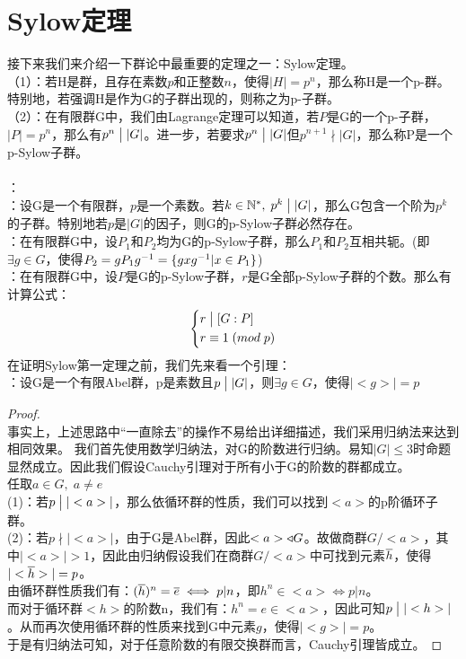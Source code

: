 \section{Sylow定理}
接下来我们来介绍一下群论中最重要的定理之一：Sylow定理。\\
（1）：若H是群，且存在素数$p$和正整数$n$，使得$|H|=p^n$，那么称H是一个p-群。特别地，若强调H是作为G的子群出现的，则称之为p-子群。\\
\indent （2）：在有限群G中，我们由Lagrange定理可以知道，若$P$是G的一个p-子群，$|P|=p^n$，那么有$p^n\bigm| |G|$。进一步，若要求$p^n\bigm| |G|$但$p^{n+1}\nmid |G|$，那么称P是一个p-Sylow子群。\\
\\
：\\
\indent {}：设G是一个有限群，$p$是一个素数。若$k\in \mathbb{N}^*,\; p^k\bigm| |G|$，那么G包含一个阶为$p^k$的子群。特别地若$p$是$|G|$的因子，则G的p-Sylow子群必然存在。\\
\indent {}：在有限群G中，设$P_1$和$P_2$均为G的p-Sylow子群，那么$P_1$和$P_2$互相共轭。(即$\exists g\in G$，使得$P_2=gP_1{g}^{-1}=\{gx{g}^{-1}|x\in P_1\}$)\\
\indent {}：在有限群G中，设$P$是G的p-Sylow子群，$r$是G全部p-Sylow子群的个数。那么有计算公式：
\[
\left\{
\begin{aligned}
&r\bigm|[G:P]\\
&r\equiv 1 \;(mod\; p)
\end{aligned}\right.
\]
在证明Sylow第一定理之前，我们先来看一个引理：\\
：设G是一个有限Abel群，p是素数且$p\bigm||G|$，则$\exists g\in G$，使得$|<g>|=p$\\
\begin{proof}
\\
事实上，上述思路中“一直除去”的操作不易给出详细描述，我们采用归纳法来达到相同效果。
我们首先使用数学归纳法，对G的阶数进行归纳。易知$|G|\leq 3$时命题显然成立。因此我们假设Cauchy引理对于所有小于G的阶数的群都成立。\\
任取$a\in G,\; a\neq e$\\
\indent (1)：若$p\bigm| |<a>|$，那么依循环群的性质，我们可以找到$<a>$的p阶循环子群。\\
\indent (2)：若$p\nmid |<a>|$，由于G是Abel群，因此$<a>\triangleleft G$。故做商群$G/<a>$，其中$|<a>|>1$，因此由归纳假设我们在商群$G/<a>$中可找到元素$\overline{h}$，使得$|<\overline{h}>|=p$。\\
由循环群性质我们有：$(\overline{h})^n=\overline{e}\iff p|n$，即$h^n\in <a>\iff p|n$。\\
而对于循环群$<h>$的阶数n，我们有：$h^n=e\in <a>$，因此可知$p\bigm| |<h>|$。从而再次使用循环群的性质来找到G中元素$g$，使得$|<g>|=p$。\\
于是有归纳法可知，对于任意阶数的有限交换群而言，Cauchy引理皆成立。
\end{proof}
